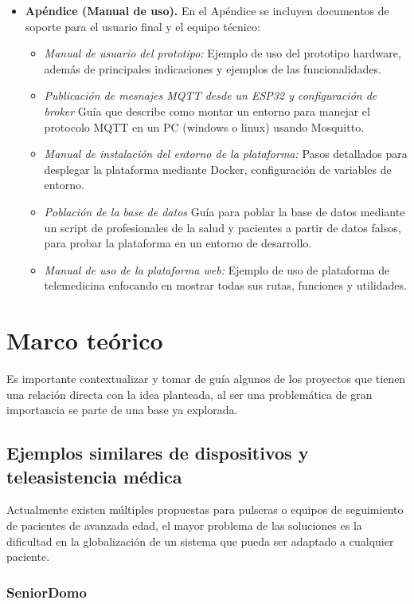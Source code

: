 \documentclass[12pt, a4paper]{article}
\begin{document}
\begin{itemize}
		\item \textbf{Apéndice (Manual de uso).}  
		En el Apéndice se incluyen documentos de soporte para el usuario final y el equipo técnico:
		\begin{itemize}
			\item \emph{Manual de usuario del prototipo:} Ejemplo de uso del prototipo hardware, además de principales indicaciones y ejemplos de las funcionalidades.  
			\item \emph{Publicación de mesnajes MQTT desde un ESP32 y configuración de broker} Guía que describe como montar un entorno para manejar el protocolo MQTT en un PC (windows o linux) usando Mosquitto.
			\item \emph{Manual de instalación del entorno de la plataforma:} Pasos detallados para desplegar la plataforma mediante Docker, configuración de variables de entorno.
			\item \emph{Población de la base de datos} Guía para poblar la base de datos mediante un script de profesionales de la salud y pacientes a partir de datos falsos, para probar la plataforma en un entorno de desarrollo.
			\item \emph{Manual de uso de la plataforma web:} Ejemplo de uso de plataforma de telemedicina enfocando en mostrar todas sus rutas,  funciones y utilidades. 
		\end{itemize}
	\end{itemize}
	

\section{Marco teórico}

	Es importante contextualizar y tomar de guía algunos de los proyectos que tienen una relación directa con la idea planteada, al ser una problemática de gran importancia se parte de una base ya explorada.

	\subsection{Ejemplos similares de dispositivos y teleasistencia médica}
	
	Actualmente existen múltiples propuestas para pulseras o equipos de seguimiento de pacientes de avanzada edad, el mayor problema de las soluciones es la dificultad en la globalización de un sistema que pueda ser adaptado a cualquier paciente.
	
	\subsubsection{SeniorDomo}
	
\end{document}
